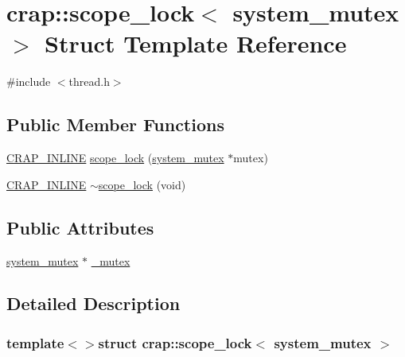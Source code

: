 \hypertarget{structcrap_1_1scope__lock_3_01system__mutex_01_4}{}\section{crap\+:\+:scope\+\_\+lock$<$ system\+\_\+mutex $>$ Struct Template Reference}
\label{structcrap_1_1scope__lock_3_01system__mutex_01_4}


{\ttfamily \#include $<$thread.\+h$>$}

\subsection*{Public Member Functions}
\begin{DoxyCompactItemize}
\item 
\hyperlink{config__x86_8h_a5a40526b8d842e7ff731509998bb0f1c}{C\+R\+A\+P\+\_\+\+I\+N\+L\+I\+N\+E} \hyperlink{structcrap_1_1scope__lock_3_01system__mutex_01_4_a09c093b6fbc1051656b67efd0f97d3e0}{scope\+\_\+lock} (\hyperlink{classcrap_1_1system__mutex}{system\+\_\+mutex} $\ast$mutex)
\item 
\hyperlink{config__x86_8h_a5a40526b8d842e7ff731509998bb0f1c}{C\+R\+A\+P\+\_\+\+I\+N\+L\+I\+N\+E} \hyperlink{structcrap_1_1scope__lock_3_01system__mutex_01_4_a04129f556b65228da8027a9f06c01f19}{$\sim$scope\+\_\+lock} (void)
\end{DoxyCompactItemize}
\subsection*{Public Attributes}
\begin{DoxyCompactItemize}
\item 
\hyperlink{classcrap_1_1system__mutex}{system\+\_\+mutex} $\ast$ \hyperlink{structcrap_1_1scope__lock_3_01system__mutex_01_4_a3b2b0e888958844a834b7bde108c4b10}{\+\_\+mutex}
\end{DoxyCompactItemize}


\subsection{Detailed Description}
\subsubsection*{template$<$$>$struct crap\+::scope\+\_\+lock$<$ system\+\_\+mutex $>$}



